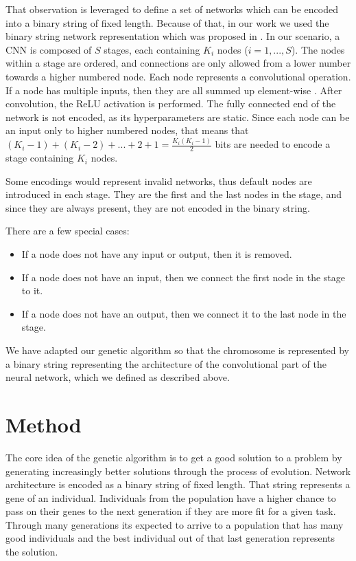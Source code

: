\documentclass[eng]{simposium}
\begin{document}
That observation is leveraged to define a set of networks which  
can be encoded into a binary string of fixed length.  
Because of that, in our work we used the binary string network representation which was proposed in \cite{4}.  
In our scenario, a CNN is composed of $S$ stages, each containing  
$K_i$ nodes ($i=1,...,S$).  
The nodes within a stage are ordered, and connections are only allowed from a lower number towards a higher numbered node. 
Each node represents a convolutional operation. If a node has multiple inputs, then they are all summed up element-wise \cite{4}. 
After convolution, the ReLU activation is performed.  
The fully connected end of the network is not encoded, as its hyperparameters are static.  
Since each node can be an input only to higher numbered nodes, that means that  
$(K_i -1) + (K_i - 2) + ... + 2 + 1 = \frac{K_i(K_i-1)}{2}$ bits are needed to encode a stage containing $K_i$ nodes. 

Some encodings would represent invalid networks, thus default nodes are introduced in each stage. 
They are the first and the last nodes in the stage, and since they are always present, they are not encoded in the binary string. 

There are a few special cases: 
\begin{itemize} 
    \item If a node does not have any input or output, then it is removed. 
    \item If a node does not have an input, then we connect the first node in the stage to it. 
    \item If a node does not have an output, then we connect it to the last node in the stage. 
\end{itemize} 

We have adapted our genetic algorithm so that the chromosome is represented by a binary string representing  
the architecture of the convolutional part of the neural network, which we defined as described above.  

\section{Method} 
  
The core idea of the genetic algorithm is to get a good solution to a problem by generating increasingly better solutions through the process of evolution. 
Network architecture is encoded as a binary string of fixed length. That string represents a gene of an individual. 
Individuals from the population have a higher chance to pass on their genes to the next generation if they are more fit for a given task. 
Through many generations its expected to arrive to a population that has many good individuals and the best individual out of that last generation represents the solution. 
\end{document}
